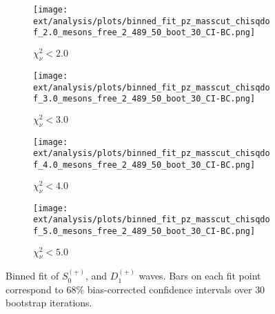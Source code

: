 \begin{figure}[htbp]
    \centering
    \begin{subfigure}{0.45\textwidth}
        \texttt{[image: ext/analysis/plots/binned\_fit\_pz\_masscut\_chisqdof\_2.0\_mesons\_free\_2\_489\_50\_boot\_30\_CI-BC.png]}
        \caption{$\chi^2_\nu < 2.0$}
    \end{subfigure}
    \hfill
    \begin{subfigure}{0.45\textwidth}
        \texttt{[image: ext/analysis/plots/binned\_fit\_pz\_masscut\_chisqdof\_3.0\_mesons\_free\_2\_489\_50\_boot\_30\_CI-BC.png]}
        \caption{$\chi^2_\nu < 3.0$}
    \end{subfigure}
    \vspace{1em}
    \begin{subfigure}{0.45\textwidth}
        \texttt{[image: ext/analysis/plots/binned\_fit\_pz\_masscut\_chisqdof\_4.0\_mesons\_free\_2\_489\_50\_boot\_30\_CI-BC.png]}
        \caption{$\chi^2_\nu < 4.0$}
    \end{subfigure}
    \hfill
    \begin{subfigure}{0.45\textwidth}
        \texttt{[image: ext/analysis/plots/binned\_fit\_pz\_masscut\_chisqdof\_5.0\_mesons\_free\_2\_489\_50\_boot\_30\_CI-BC.png]}
        \caption{$\chi^2_\nu < 5.0$}
    \end{subfigure}

    \caption{Binned fit of $S_{0}^{(+)}$, and $D_{1}^{(+)}$ waves. Bars on each fit point correspond to $68\%$ bias-corrected confidence intervals over $ 30 $ bootstrap iterations.}
    \label{fig:binned-fit-all-Sp-D1p}
\end{figure}

